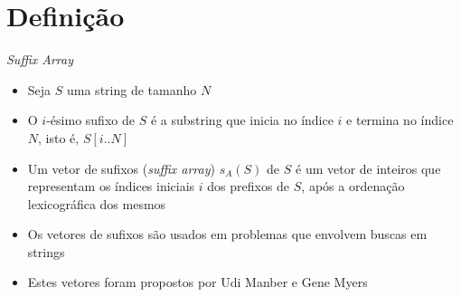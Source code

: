 \section{Definição}

\begin{frame}[fragile]{{\it Suffix Array}}

    \begin{itemize}
        \item Seja $S$ uma string de tamanho $N$

        \item O $i$-ésimo sufixo de $S$ é a substring que inicia no índice $i$ e termina no
            índice $N$, isto é, $S[i..N]$

        \item Um vetor de sufixos (\textit{suffix array}) $s_A(S)$ de $S$ é um vetor de inteiros 
            que representam
            os índices iniciais $i$ dos prefixos de $S$, após a ordenação lexicográfica dos
            mesmos

        \item Os vetores de sufixos são usados em problemas que envolvem buscas em strings

        \item Estes vetores foram propostos por Udi Manber e Gene Myers
    \end{itemize}

\end{frame}

